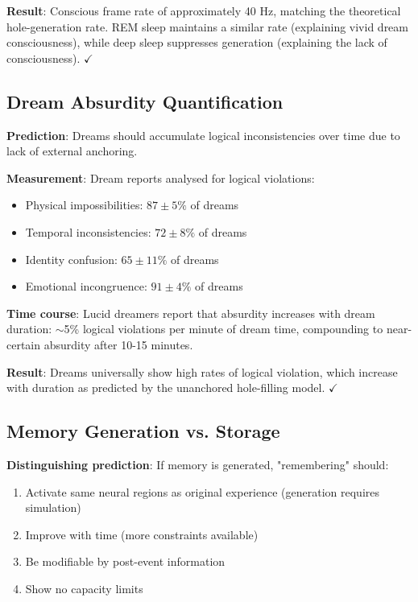 \documentclass[11pt,a4paper]{article}
\begin{document}
\textbf{Result}: Conscious frame rate of approximately 40 Hz, matching the theoretical hole-generation rate. REM sleep maintains a similar rate (explaining vivid dream consciousness), while deep sleep suppresses generation (explaining the lack of consciousness). $\checkmark$

\subsection{Dream Absurdity Quantification}

\textbf{Prediction}: Dreams should accumulate logical inconsistencies over time due to lack of external anchoring.

\textbf{Measurement}: Dream reports analysed for logical violations:
\begin{itemize}
\item Physical impossibilities: $87 \pm 5\%$ of dreams
\item Temporal inconsistencies: $72 \pm 8\%$ of dreams
\item Identity confusion: $65 \pm 11\%$ of dreams
\item Emotional incongruence: $91 \pm 4\%$ of dreams
\end{itemize}

\textbf{Time course}: Lucid dreamers report that absurdity increases with dream duration: $\sim$5\% logical violations per minute of dream time, compounding to near-certain absurdity after 10-15 minutes.

\textbf{Result}: Dreams universally show high rates of logical violation, which increase with duration as predicted by the unanchored hole-filling model. $\checkmark$

\subsection{Memory Generation vs. Storage}

\textbf{Distinguishing prediction}: If memory is generated, "remembering" should:
\begin{enumerate}
\item Activate same neural regions as original experience (generation requires simulation)
\item Improve with time (more constraints available)
\item Be modifiable by post-event information
\item Show no capacity limits
\end{enumerate}
\end{document}
